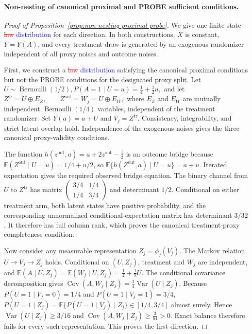 \paragraph{Non-nesting of canonical proximal and PROBE sufficient conditions.}
\begin{proof}[Proof of Proposition~\ref{prop:non-nesting-proximal-probe}]
We give one finite-state \textcolor{red}{\sout{law}} \textcolor{blue}{distribution} for each direction. In both constructions, $X$ is constant, $Y=Y(A)$, and every treatment draw is generated by an exogenous randomizer independent of all proxy noises and outcome noises.

First, we construct a \textcolor{red}{\sout{law}} \textcolor{blue}{distribution} satisfying the canonical proximal conditions but not the PROBE conditions for the designated proxy split. Let
\(U\sim\operatorname{Bernoulli}(1/2), P(A=1\mid U=u)=\frac14+\frac12u,\)
and let
\(Z^{\mathrm{tr}}=U\mathbin\oplus E_Z, \qquad Z^{\mathrm{out}}=W_j=U\mathbin\oplus E_W,\)
where $E_Z$ and $E_W$ are mutually independent $\operatorname{Bernoulli}(1/4)$ variables, independent of the treatment randomizer. Set $Y(a)=a+U$ and $V_j=Z^{\mathrm{tr}}$. Consistency, integrability, and strict latent overlap hold. Independence of the exogenous noises gives the three canonical proxy-validity conditions.

The function
\(h(z^{\mathrm{out}},a)=a+2z^{\mathrm{out}}-\frac12\)
is an outcome bridge because $\mathbb E(Z^{\mathrm{out}}\mid U=u)=1/4+u/2$, so $\mathbb E\{h(Z^{\mathrm{out}},a)\mid U=u\}=a+u$. Iterated expectation gives the required observed bridge equation. The binary channel from $U$ to $Z^{\mathrm{tr}}$ has matrix
\(\begin{pmatrix} 3/4&1/4\\ 1/4&3/4 \end{pmatrix}\)
and determinant $1/2$. Conditional on either treatment arm, both latent states have positive probability, and the corresponding unnormalized conditional-expectation matrix has determinant $3/32$. It therefore has full column rank, which proves the canonical treatment-proxy completeness condition.

Now consider any measurable representation $Z_j=\phi_j(V_j)$. The Markov relation $U\to V_j\to Z_j$ holds. Conditional on $(U,Z_j)$, treatment and $W_j$ are independent, and
\(\mathbb E(A\mid U,Z_j) = \mathbb E(W_j\mid U,Z_j) = \frac14+\frac12U.\)
The conditional covariance decomposition gives
\(\operatorname{Cov}(A,W_j\mid Z_j) = \frac14\operatorname{Var}(U\mid Z_j).\)
Because $P(U=1\mid V_j=0)=1/4$ and $P(U=1\mid V_j=1)=3/4$,
\(P(U=1\mid Z_j) = \mathbb E\{P(U=1\mid V_j)\mid Z_j\} \in[1/4,3/4]\)
almost surely. Hence $\operatorname{Var}(U\mid Z_j)\ge3/16$ and
\(\operatorname{Cov}(A,W_j\mid Z_j)\ge\frac{3}{64}>0.\)
Exact balance therefore fails for every such representation. This proves the first direction.


\end{proof}
